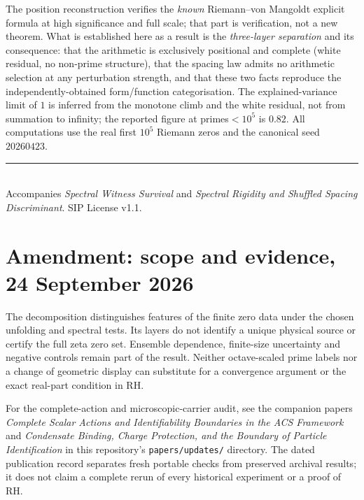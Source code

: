 \documentclass[11pt]{article}
\begin{document}
The position reconstruction verifies the \emph{known} Riemann--von Mangoldt explicit formula at high significance and full scale; that part is verification, not a new theorem. What is established here as a result is the \emph{three-layer separation} and its consequence: that the arithmetic is exclusively positional and complete (white residual, no non-prime structure), that the spacing law admits no arithmetic selection at any perturbation strength, and that these two facts reproduce the independently-obtained form/function categorisation. The explained-variance limit of $1$ is inferred from the monotone climb and the white residual, not from summation to infinity; the reported figure at primes${}<10^5$ is $0.82$. All computations use the real first $10^5$ Riemann zeros and the canonical seed $20260423$.

\vspace{1em}
\noindent\rule{\linewidth}{0.4pt}\\
\small Accompanies \textit{Spectral Witness Survival} and \textit{Spectral Rigidity and Shuffled Spacing Discriminant}. SIP License v1.1.


\section*{Amendment: scope and evidence, 24 September 2026}
The decomposition distinguishes features of the finite zero data under the chosen unfolding and spectral tests. Its layers do not identify a unique physical source or certify the full zeta zero set. Ensemble dependence, finite-size uncertainty and negative controls remain part of the result. Neither octave-scaled prime labels nor a change of geometric display can substitute for a convergence argument or the exact real-part condition in RH.

For the complete-action and microscopic-carrier audit, see the companion
papers \emph{Complete Scalar Actions and Identifiability Boundaries in the ACS
Framework} and \emph{Condensate Binding, Charge Protection, and the Boundary
of Particle Identification} in this repository's \texttt{papers/updates/}
directory. The dated publication record separates fresh portable checks
from preserved archival results; it does not claim a complete rerun of every
historical experiment or a proof of RH.
\end{document}
